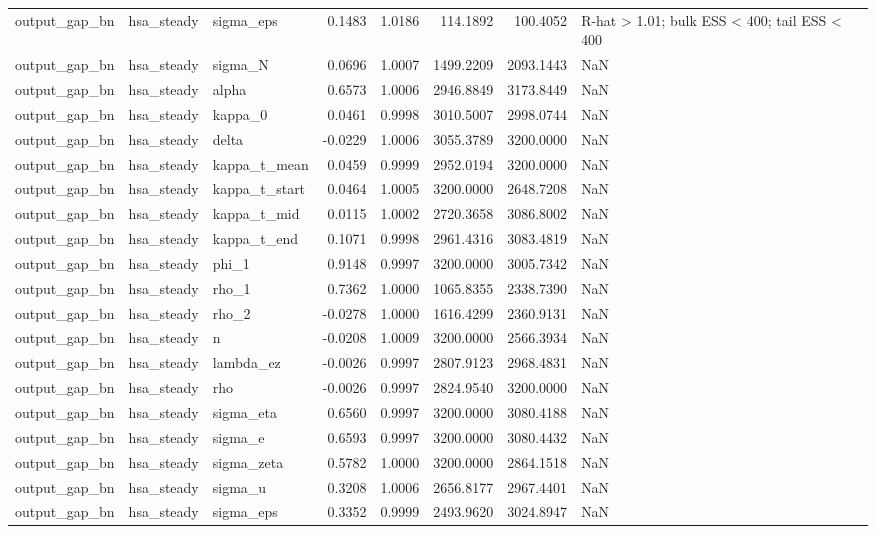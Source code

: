 \begin{tabular}{lllrrrrl}
output\_gap\_bn & hsa\_steady & sigma\_eps & 0.1483 & 1.0186 & 114.1892 & 100.4052 & R-hat > 1.01; bulk ESS < 400; tail ESS < 400 \\
output\_gap\_bn & hsa\_steady & sigma\_N & 0.0696 & 1.0007 & 1499.2209 & 2093.1443 & NaN \\
output\_gap\_bn & hsa\_steady & alpha & 0.6573 & 1.0006 & 2946.8849 & 3173.8449 & NaN \\
output\_gap\_bn & hsa\_steady & kappa\_0 & 0.0461 & 0.9998 & 3010.5007 & 2998.0744 & NaN \\
output\_gap\_bn & hsa\_steady & delta & -0.0229 & 1.0006 & 3055.3789 & 3200.0000 & NaN \\
output\_gap\_bn & hsa\_steady & kappa\_t\_mean & 0.0459 & 0.9999 & 2952.0194 & 3200.0000 & NaN \\
output\_gap\_bn & hsa\_steady & kappa\_t\_start & 0.0464 & 1.0005 & 3200.0000 & 2648.7208 & NaN \\
output\_gap\_bn & hsa\_steady & kappa\_t\_mid & 0.0115 & 1.0002 & 2720.3658 & 3086.8002 & NaN \\
output\_gap\_bn & hsa\_steady & kappa\_t\_end & 0.1071 & 0.9998 & 2961.4316 & 3083.4819 & NaN \\
output\_gap\_bn & hsa\_steady & phi\_1 & 0.9148 & 0.9997 & 3200.0000 & 3005.7342 & NaN \\
output\_gap\_bn & hsa\_steady & rho\_1 & 0.7362 & 1.0000 & 1065.8355 & 2338.7390 & NaN \\
output\_gap\_bn & hsa\_steady & rho\_2 & -0.0278 & 1.0000 & 1616.4299 & 2360.9131 & NaN \\
output\_gap\_bn & hsa\_steady & n & -0.0208 & 1.0009 & 3200.0000 & 2566.3934 & NaN \\
output\_gap\_bn & hsa\_steady & lambda\_ez & -0.0026 & 0.9997 & 2807.9123 & 2968.4831 & NaN \\
output\_gap\_bn & hsa\_steady & rho & -0.0026 & 0.9997 & 2824.9540 & 3200.0000 & NaN \\
output\_gap\_bn & hsa\_steady & sigma\_eta & 0.6560 & 0.9997 & 3200.0000 & 3080.4188 & NaN \\
output\_gap\_bn & hsa\_steady & sigma\_e & 0.6593 & 0.9997 & 3200.0000 & 3080.4432 & NaN \\
output\_gap\_bn & hsa\_steady & sigma\_zeta & 0.5782 & 1.0000 & 3200.0000 & 2864.1518 & NaN \\
output\_gap\_bn & hsa\_steady & sigma\_u & 0.3208 & 1.0006 & 2656.8177 & 2967.4401 & NaN \\
output\_gap\_bn & hsa\_steady & sigma\_eps & 0.3352 & 0.9999 & 2493.9620 & 3024.8947 & NaN \\

\end{tabular}
